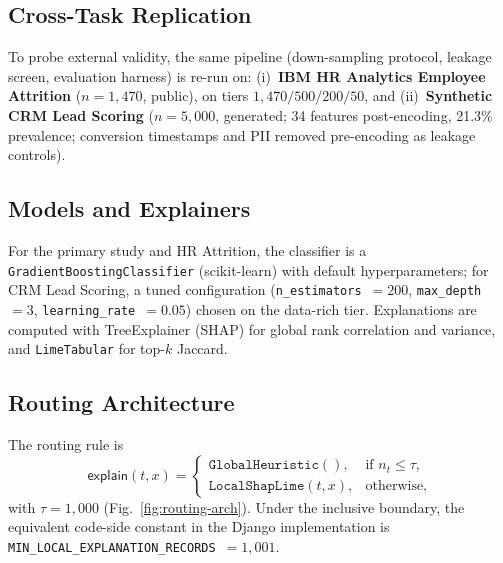 \documentclass[conference]{IEEEtran}
\newcommand{\nT}{n_t}
\begin{document}
\subsection{Cross-Task Replication}
To probe external validity, the same pipeline (down-sampling protocol,
leakage screen, evaluation harness) is re-run on:
(i)~\textbf{IBM HR Analytics Employee Attrition} ($n = 1{,}470$, public),
on tiers $1{,}470 / 500 / 200 / 50$, and
(ii)~\textbf{Synthetic CRM Lead Scoring} ($n = 5{,}000$, generated; 34
features post-encoding, 21.3\% prevalence; conversion timestamps and PII
removed pre-encoding as leakage controls).

\subsection{Models and Explainers}
For the primary study and HR Attrition, the classifier is a
\texttt{GradientBoostingClassifier} (scikit-learn) with default
hyperparameters; for CRM Lead Scoring, a tuned configuration
(\texttt{n\_estimators}~$=200$, \texttt{max\_depth}~$=3$,
\texttt{learning\_rate}~$=0.05$) chosen on the data-rich tier.
Explanations are computed with TreeExplainer (SHAP) for global rank
correlation and variance, and \texttt{LimeTabular} for top-$k$ Jaccard.

\subsection{Routing Architecture}
The routing rule is
\begin{equation}
\label{eq:routing}
\mathsf{explain}(t, x) = \begin{cases}
  \texttt{GlobalHeuristic}(),  & \text{if } \nT \le \tau,\\
  \texttt{LocalShapLime}(t, x), & \text{otherwise,}
\end{cases}
\end{equation}
with $\tau = 1{,}000$ (Fig.~\ref{fig:routing-arch}). Under the inclusive
boundary, the equivalent code-side constant in the Django implementation
is \texttt{MIN\_LOCAL\_EXPLANATION\_RECORDS}~$= 1{,}001$.
\end{document}

